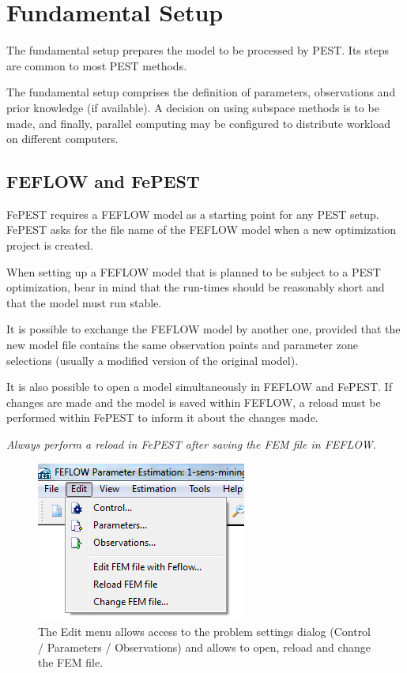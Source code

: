 
\chapter{Fundamental Setup}
\label{sec:fepest:fundamentalSetup}

The fundamental setup prepares the model to be processed by PEST. Its steps are common to most PEST methods.

The fundamental setup comprises the definition of parameters, observations and prior knowledge (if available). A decision on using subspace methods is to be made, and finally, parallel computing may be configured to distribute workload on different computers.

\section{FEFLOW and FePEST}

FePEST requires a FEFLOW model as a starting point for any PEST setup. FePEST asks for the file name of the FEFLOW model when a new optimization project is created. 

When setting up a FEFLOW model that is planned to be subject to a PEST optimization, bear in mind that the run-times should be reasonably short and that the model must run stable.

It is possible to exchange the FEFLOW model by another one, provided that the new model file contains the same observation points and parameter zone selections (usually a modified version of the original model).

It is also possible to open a model simultaneously in FEFLOW and FePEST. If changes are made and the model is saved within FEFLOW, a reload must be performed within FePEST to inform it about the changes made.

\textit{Always perform a reload in FePEST after saving the FEM file in FEFLOW.}\marginpar{*}

\begin{figure}
	\center
	\includegraphics[width=0.7\columnwidth]{figureFundamentalSetup/FePESTEditMenu.png}
\caption{The Edit menu allows access to the problem settings dialog (Control / Parameters / Observations) and allows to open, reload and change the FEM file.}
\label{fig:fepest:FePESTEditMenu}
\end{figure} 


